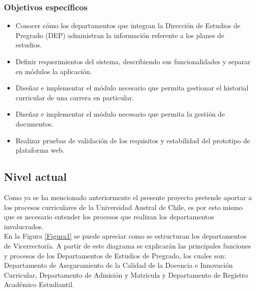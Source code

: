 	\subsubsection{Objetivos específicos}
	
	\begin{itemize}
		\item Conocer cómo los departamentos que integran la Dirección de Estudios de Pregrado (DEP) administran
		la información referente a los planes de estudios.
		\item  Definir requerimientos del sistema, describiendo sus funcionalidades y separar en módulos la aplicación.
		\item Diseñar e implementar el módulo necesario que permita gestionar el historial curricular de una carrera en particular.
		\item Diseñar e implementar el módulo necesario que permita la gestión de documentos.
		\item Realizar pruebas de validación de los requisitos y estabilidad del prototipo de plataforma web.
	\end{itemize}
	
	\subsection{Nivel actual}
	
		Como ya se ha mencionado anteriormente el presente proyecto pretende aportar a los procesos curriculares de la Universidad Austral de Chile, es por esto mismo que es necesario entender los procesos que realizan los departamentos involucrados.
		\\
		
		En la Figura \ref{Figura1} se puede apreciar como se estructuran los departamentos de Vicerrectoría. A partir de este diagrama se explicarán las principales funciones y procesos de los Departamentos de Estudios de Pregrado, los cuales son: Departamento de Aseguramiento de la Calidad de la Docencia e Innovación Curricular, Departamento de Admisión y Matricula y Departamento de Registro Académico Estudiantil.
	
